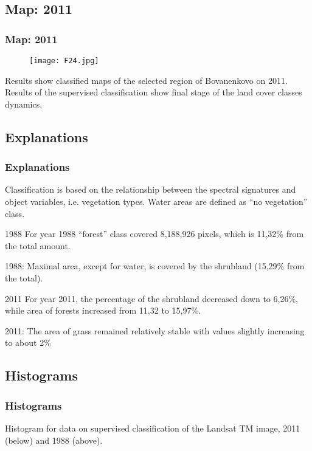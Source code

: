 \documentclass[pdflatex,compress,8pt,
	xcolor={dvipsnames,dvipsnames,svgnames,x11names,table},
	hyperref={colorlinks = true,breaklinks = true, urlcolor = NavyBlue, breaklinks = true}]{beamer}
\begin{document}
\subsection{Map: 2011}
\begin{frame}\frametitle{Map: 2011}
\begin{figure}[H]
	\centering
		\texttt{[image: F24.jpg]}
\end{figure}
\small{Results show classified maps of the selected region of Bovanenkovo on 2011. \\
Results of the supervised classification show final stage of the land cover classes dynamics.}
\end{frame}

\subsection{Explanations}
\begin{frame}\frametitle{Explanations}
Classification is based on the relationship between the spectral signatures and object variables, i.e. vegetation types. Water areas are defined as “no vegetation” class.

\begin{block}{1988}
For year 1988 “forest” class covered 8,188,926 pixels, which is 11,32\% from the total amount.
\end{block}

\begin{examples}{1988:}
Maximal area, except for water, is covered by the shrubland (15,29\% from the total).
\end{examples}

\begin{block}{2011}
For year 2011, the percentage of the shrubland decreased down to 6,26\%, while area of forests increased from 11,32 to 15,97\%.
\end{block}

\begin{examples}{2011:}
The area of grass remained relatively stable with values slightly increasing to about 2\%
\end{examples}

\end{frame}

\subsection{Histograms}
\begin{frame}\frametitle{Histograms}
Histogram for data on supervised classification of the Landsat TM image, 2011 (below) and 1988 (above).
\begin{figure}[H]
	\centering
			\vspace{2mm}
\end{figure}
\end{frame}
\end{document}
